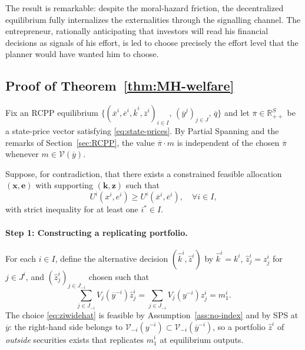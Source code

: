 \documentclass[11pt,a4paper,oneside]{book}
\def\R{\mathbb{R}}
\def\geq{\geqslant}
\theoremstyle{plain}
\theoremstyle{definition}
\theoremstyle{remark}
\numberwithin{equation}{chapter}
\begin{document}
The result is remarkable: despite the moral-hazard friction, the decentralized equilibrium fully internalizes the externalities through the signalling channel.
The entrepreneur, rationally anticipating that investors will read his financial decisions as signals of his effort, is led to choose precisely the effort level that the planner would have wanted him to choose.

\subsection{Proof of Theorem~\ref{thm:MH-welfare}}

Fix an RCPP equilibrium $\bigl\{ (\overline{x}^i, \overline{e}^i, \overline{k}^i, \overline{z}^i)_{i \in I}, \, (\overline{y}^j)_{j \in J}, \, \overline{q} \bigr\}$ and let $\overline{\pi} \in \R_{++}^S$ be a state-price vector satisfying \eqref{eq:state-prices}.
By Partial Spanning and the remarks of Section~\ref{sec:RCPP}, the value $\overline{\pi} \cdot m$ is independent of the chosen $\overline{\pi}$ whenever $m \in \mathcal{V}(\overline{y})$.

Suppose, for contradiction, that there exists a constrained feasible allocation $(\bm{x}, \bm{e})$ with supporting $(\bm{k}, \bm{z})$ such that
\begin{equation}\label{eq:cpo-dominance}
  U^i(x^i, e^i) \geq U^i(\overline{x}^i, \overline{e}^i), \quad \forall i \in I,
\end{equation}
with strict inequality for at least one $i^\ast \in I$.

\paragraph{Step 1: Constructing a replicating portfolio.}
For each $i \in I$, define the alternative decision $(\widehat{k}^i, \widehat{z}^i)$ by $\widehat{k}^i = k^i$, $\widehat{z}^i_j = z^i_j$ for $j \in J^i$, and $(\widehat{z}^i_j)_{j \in J_{-i}}$ chosen such that
\begin{equation}\label{eq:ziwidehat}
  \sum_{j \in J_{-i}} V_j(\overline{y}^{-i}) \widehat{z}^i_j = \sum_{j \in J_{-i}} V_j(y^{-i}) z^i_j = m^i_1.
\end{equation}
The choice \eqref{eq:ziwidehat} is feasible by Assumption~\ref{ass:no-index} and by SPS at $\overline{y}$: the right-hand side belongs to $\mathcal{V}_{-i}(y^{-i}) \subset \mathcal{V}_{-i}(\overline{y}^{-i})$, so a portfolio $\widehat{z}^i$ of \emph{outside} securities exists that replicates $m^i_1$ at equilibrium outputs.
\end{document}

